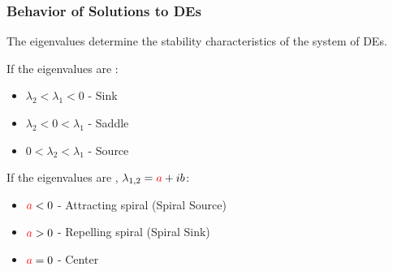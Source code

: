 \begin{frame}
  \frametitle{Behavior of Solutions to DEs}

  The eigenvalues determine the stability characteristics of the
  system of DEs.

  If the eigenvalues are :
  \begin{itemize}
  \item $\lambda_2 < \lambda_1 < 0$ - Sink
  \item $\lambda_2 < 0 < \lambda_1$ - Saddle
  \item $0 < \lambda_2 < \lambda_1$ - Source
  \end{itemize}

  If the eigenvalues are , $\lambda_{1,2}={\color{red}a}+ib$:
  \begin{itemize}
  \item ${\color{red}a}<0$ - Attracting spiral (Spiral Source)
  \item ${\color{red}a}>0$ - Repelling spiral  (Spiral Sink)
  \item ${\color{red}a}=0$ - Center
  \end{itemize}

\end{frame}

